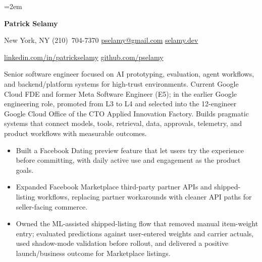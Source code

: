 
\usepackage{iftex}
\ifPDFTeX
  
  \usepackage{microtype}
\fi
\emergencystretch=2em
\sloppy

{\Huge\bfseries Patrick Selamy}\par\vspace{3pt}
{\small New York, NY \textbar{} (210)~704-7370 \textbar{} \href{mailto:pselamy@gmail.com}{pselamy@gmail.com} \textbar{} \href{https://selamy.dev}{selamy.dev}}\par
{\small \href{https://www.linkedin.com/in/patrickselamy}{linkedin.com/in/patrickselamy} \textbar{} \href{https://github.com/pselamy}{github.com/pselamy}}\par
{}

Senior software engineer focused on AI prototyping, evaluation, agent workflows, and backend/platform systems for high-trust environments. Current Google Cloud FDE and former Meta Software Engineer (E5); in the earlier Google engineering role, promoted from L3 to L4 and selected into the 12-engineer Google Cloud Office of the CTO Applied Innovation Factory. Builds pragmatic systems that connect models, tools, retrieval, data, approvals, telemetry, and product workflows with measurable outcomes.


\begin{itemize}
  \item Built a Facebook Dating preview feature that let users try the experience before committing, with daily active use and engagement as the product goals.
  \item Expanded Facebook Marketplace third-party partner APIs and shipped-listing workflows, replacing partner workarounds with cleaner API paths for seller-facing commerce.
  \item Owned the ML-assisted shipped-listing flow that removed manual item-weight entry; evaluated predictions against user-entered weights and carrier actuals, used shadow-mode validation before rollout, and delivered a positive launch/business outcome for Marketplace listings.
\end{itemize}

